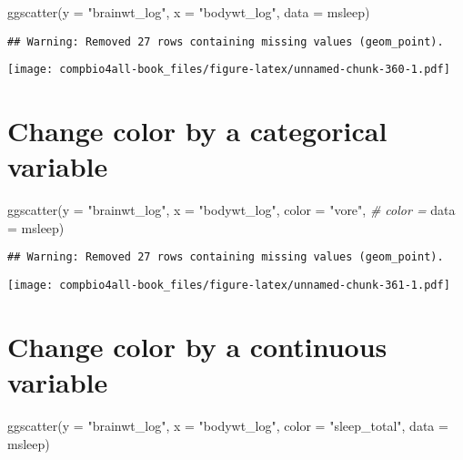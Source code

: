 \documentclass[
]{book}
\newenvironment{Shaded}{\begin{snugshade}}{\end{snugshade}}
\newcommand{\AttributeTok}[1]{\textcolor[rgb]{0.77,0.63,0.00}{#1}}
\newcommand{\CommentTok}[1]{\textcolor[rgb]{0.56,0.35,0.01}{\textit{#1}}}
\newcommand{\FunctionTok}[1]{\textcolor[rgb]{0.00,0.00,0.00}{#1}}
\newcommand{\NormalTok}[1]{#1}
\newcommand{\StringTok}[1]{\textcolor[rgb]{0.31,0.60,0.02}{#1}}
\begin{document}
\begin{Shaded}
\begin{Highlighting}[]
\FunctionTok{ggscatter}\NormalTok{(}\AttributeTok{y =} \StringTok{"brainwt\_log"}\NormalTok{,}
          \AttributeTok{x =} \StringTok{"bodywt\_log"}\NormalTok{,}
          \AttributeTok{data =}\NormalTok{ msleep)}
\end{Highlighting}
\end{Shaded}

\begin{verbatim}
## Warning: Removed 27 rows containing missing values (geom_point).
\end{verbatim}

\texttt{[image: compbio4all-book\_files/figure-latex/unnamed-chunk-360-1.pdf]}

\hypertarget{change-color-by-a-categorical-variable}{%
\section{Change color by a categorical variable}\label{change-color-by-a-categorical-variable}}

\begin{Shaded}
\begin{Highlighting}[]
\FunctionTok{ggscatter}\NormalTok{(}\AttributeTok{y =} \StringTok{"brainwt\_log"}\NormalTok{,}
          \AttributeTok{x =} \StringTok{"bodywt\_log"}\NormalTok{,}
          \AttributeTok{color =} \StringTok{"vore"}\NormalTok{,    }\CommentTok{\# color = }
          \AttributeTok{data =}\NormalTok{ msleep)}
\end{Highlighting}
\end{Shaded}

\begin{verbatim}
## Warning: Removed 27 rows containing missing values (geom_point).
\end{verbatim}

\texttt{[image: compbio4all-book\_files/figure-latex/unnamed-chunk-361-1.pdf]}

\hypertarget{change-color-by-a-continuous-variable}{%
\section{Change color by a continuous variable}\label{change-color-by-a-continuous-variable}}

\begin{Shaded}
\begin{Highlighting}[]
\FunctionTok{ggscatter}\NormalTok{(}\AttributeTok{y =} \StringTok{"brainwt\_log"}\NormalTok{,}
          \AttributeTok{x =} \StringTok{"bodywt\_log"}\NormalTok{,}
          \AttributeTok{color =} \StringTok{"sleep\_total"}\NormalTok{,}
          \AttributeTok{data =}\NormalTok{ msleep)}
\end{Highlighting}
\end{Shaded}
\end{document}
